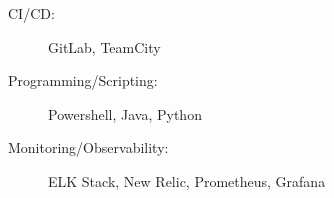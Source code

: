 \begin{minipage}[t]{.5\linewidth}
  \begin{description}
    \item[CI/CD:] GitLab, TeamCity
  \end{description}
\end{minipage}

\begin{minipage}
  \begin{description}
    \item[Programming/Scripting:] Powershell, Java, Python
  \end{description}
\end{minipage}

\begin{minipage}
  \begin{description}
    \item[Monitoring/Observability:] ELK Stack, New Relic, Prometheus, Grafana
  \end{description}
\end{minipage}

